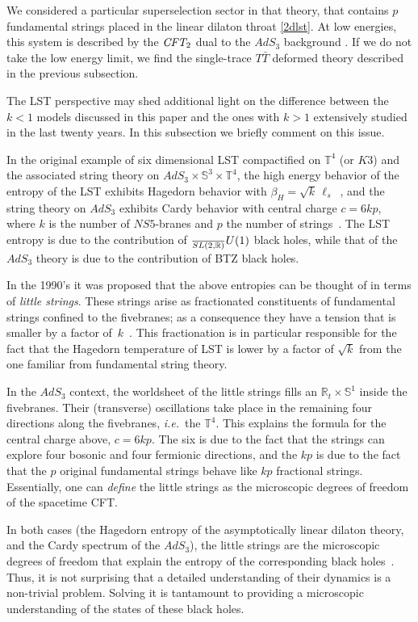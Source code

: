 \documentclass[12pt]{article}
\def\sltwo{\ensuremath{SL(2,\bR)}}
\def\uone{U(1)}
\def\ie{{i.e.}}
\def\lstr{\ell_{\textit{s}}}
\newcommand{\bR}{{\mathbb R}}
\newcommand{\bS}{{\mathbb S}}
\newcommand{\bT}{{\mathbb T}}
\numberwithin{equation}{section}
\def\ie{{\it i.e.}}
\def\ie{{\it i.e.}}
\begin{document}
We considered a particular superselection sector in that theory, that contains $p$ fundamental strings placed in the linear dilaton throat \eqref{2dlst}. At low energies, this system is described by the ${\it CFT_{\rm 2}}$ dual to the $AdS_3$ background \ourads. If we do not take the low energy limit, we find the single-trace $T\bar T$ deformed theory described in the previous subsection. 

The LST perspective may shed additional light on the difference between the $k<1$ models discussed in this paper and the ones with $k>1$ extensively studied in the last twenty years. In this subsection we briefly comment on this issue.

In the original example of six dimensional LST compactified on $\bT^4$ (or $K3$) and the associated string theory on $AdS_3\times \bS^3\times \bT^4$, the high energy behavior of the entropy of the LST exhibits Hagedorn behavior with $\beta_H=\sqrt{k}\,\lstr$~, and the string theory on $AdS_3$ exhibits Cardy behavior with central charge $c=6kp$, where $k$ is the number of $NS5$-branes and $p$ the number of strings~. The LST entropy is due to the contribution of $\frac\sltwo\uone$ black holes, while that of the $AdS_3$ theory is due to the contribution of BTZ black holes. 

In the 1990's it was proposed that the above entropies can be thought of in terms of {\it little strings}.  These strings arise as fractionated constituents of fundamental strings confined to the fivebranes; as a consequence they have a tension that is smaller by a factor of~$k$~.  This fractionation is in particular responsible for the fact that the Hagedorn temperature of LST is lower by a factor of $\sqrt k$ from the one familiar from fundamental string theory. 

In the $AdS_3$ context, the worldsheet of the little strings fills an $\bR_t\times \bS^1$ inside the fivebranes. Their (transverse) oscillations take place in the remaining four directions along the fivebranes, \ie\ the $\bT^4$. This explains the formula for the central charge above, $c=6kp$. The six is due to the fact that the strings can explore four bosonic and four fermionic directions, and the $kp$ is due to the fact that the $p$ original fundamental strings behave like $kp$ fractional strings.  Essentially, one can {\it define} the little strings as the microscopic degrees of freedom of the spacetime CFT.


In both cases (the Hagedorn entropy of the asymptotically linear dilaton theory, and the Cardy spectrum of the $AdS_3$), the little strings are the microscopic degrees of freedom that explain the entropy of the corresponding black holes~. Thus, it is not surprising that a detailed understanding of their dynamics is a non-trivial problem. Solving it is tantamount to providing a microscopic understanding of the states of these black holes.
\end{document}
